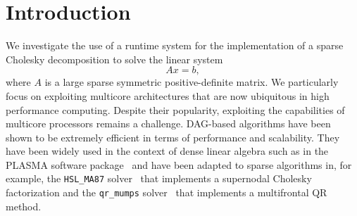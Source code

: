 \documentclass{article}
\newcommand{\lsection}[1]{\section{#1} \setcounter{equation}{0} \setcounter{figure}{0} \setcounter{table}{0} \label{#1}}
\begin{document}
\newpage
\setcounter{page}{1}


\lsection{Introduction} \label{sec:introduction} 

We investigate the use of a runtime system for the implementation of a
sparse Cholesky decomposition to solve the linear system
\begin{equation}\label{eq:linear-system}
  Ax = b,
\end{equation}
where $A$ is a large sparse symmetric positive-definite matrix. We
particularly focus on exploiting multicore architectures that are
now ubiquitous in high performance computing.
Despite their popularity, exploiting the capabilities of
multicore processors remains a challenge.
DAG-based algorithms have been shown to be extremely
efficient in terms of performance and scalability. They have
been widely used in the context of dense linear algebra such as in the
PLASMA software package~\cite{a.d.d.h.ea:09}
and have been adapted to
sparse algorithms in, for example, the \texttt{HSL\_MA87}
solver~\cite{h.r.s:10} that implements a supernodal
Cholesky factorization and the \texttt{qr\_mumps} solver~\cite{b:13}
that implements a multifrontal QR method.
\end{document}
